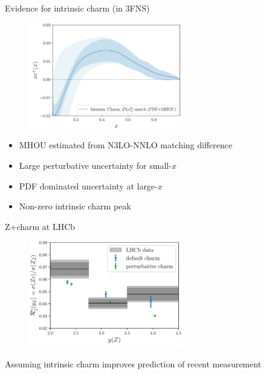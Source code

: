 \documentclass[aspectratio=43, 8pt,t]{beamer}
\begin{document}
\begin{frame}{Evidence for intrinsic charm (in 3FNS)}
  \begin{figure}
    \includegraphics[width=0.6\textwidth]{discovery_of_ic.png}
  \end{figure}
  \begin{itemize}
    \item MHOU estimated from N3LO-NNLO matching difference
    \item Large perturbative uncertainty for small-$x$
    \item PDF dominated uncertainty at large-$x$
    \item Non-zero intrinsic charm peak
  \end{itemize}
\end{frame}

\begin{frame}{Z+charm at LHCb}
  \begin{figure}
    \includegraphics[width=0.6\textwidth]{lhcb_data.png}
  \end{figure}
  Assuming intrinsic charm improves prediction of recent measurement
\end{frame}
\end{document}
